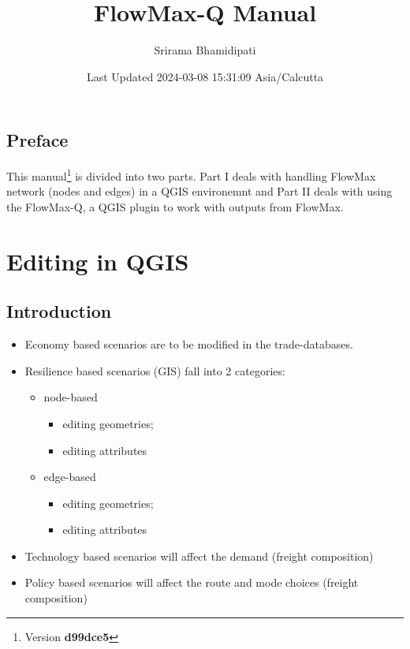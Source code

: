 \documentclass[
]{book}
\title{FlowMax-Q Manual}
\author{Srirama Bhamidipati}
\date{Last Updated 2024-03-08 15:31:09 Asia/Calcutta}
\providecommand{\tightlist}{%
  \setlength{\itemsep}{0pt}\setlength{\parskip}{0pt}}
\begin{document}
\maketitle

{
\setcounter{tocdepth}{1}
\tableofcontents
}
\chapter*{Preface}\label{preface}

This manual\footnote{Version \textbf{d99dce5}} is divided into two parts. Part I deals with handling FlowMax network (nodes and edges) in a QGIS environemnt and Part II deals with using the FlowMax-Q, a QGIS plugin to work with outputs from FlowMax.

\part{Editing in QGIS}\label{part-editing-in-qgis}

\chapter{Introduction}\label{introduction}

\begin{itemize}
\tightlist
\item
  Economy based scenarios are to be modified in the trade-databases.
\item
  Resilience based scenarios (GIS) fall into 2 categories:

  \begin{itemize}
  \tightlist
  \item
    node-based

    \begin{itemize}
    \tightlist
    \item
      editing geometries;
    \item
      editing attributes
    \end{itemize}
  \item
    edge-based

    \begin{itemize}
    \tightlist
    \item
      editing geometries;
    \item
      editing attributes
    \end{itemize}
  \end{itemize}
\item
  Technology based scenarios will affect the demand (freight composition)
\item
  Policy based scenarios will affect the route and mode choices (freight composition)
\end{itemize}
\end{document}
